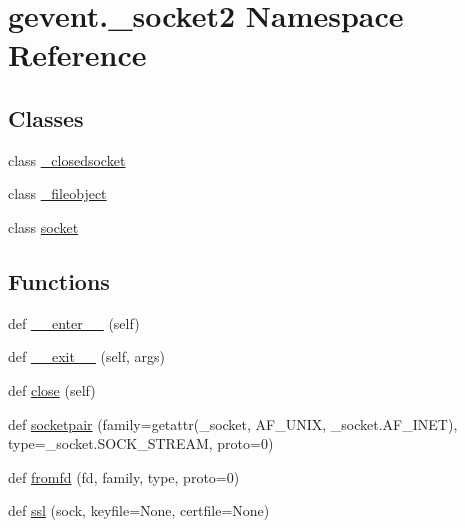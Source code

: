 \hypertarget{namespacegevent_1_1__socket2}{}\section{gevent.\+\_\+socket2 Namespace Reference}
\label{namespacegevent_1_1__socket2}
\subsection*{Classes}
\begin{DoxyCompactItemize}
\item 
class \hyperlink{classgevent_1_1__socket2_1_1__closedsocket}{\+\_\+closedsocket}
\item 
class \hyperlink{classgevent_1_1__socket2_1_1__fileobject}{\+\_\+fileobject}
\item 
class \hyperlink{classgevent_1_1__socket2_1_1socket}{socket}
\end{DoxyCompactItemize}
\subsection*{Functions}
\begin{DoxyCompactItemize}
\item 
def \hyperlink{namespacegevent_1_1__socket2_a151c509c4c19fad9a52d44312bfda6d4}{\+\_\+\+\_\+enter\+\_\+\+\_\+} (self)
\item 
def \hyperlink{namespacegevent_1_1__socket2_a24e78c834272e9de4108c2d7a69033ea}{\+\_\+\+\_\+exit\+\_\+\+\_\+} (self, args)
\item 
def \hyperlink{namespacegevent_1_1__socket2_af1f81f0318af39f13007c97ce6f4cb59}{close} (self)
\item 
def \hyperlink{namespacegevent_1_1__socket2_a4b018b6c679f6878289b2b1a4375b6bb}{socketpair} (family=getattr(\+\_\+socket, \textquotesingle{}A\+F\+\_\+\+U\+N\+IX\textquotesingle{}, \+\_\+socket.\+A\+F\+\_\+\+I\+N\+ET), type=\+\_\+socket.\+S\+O\+C\+K\+\_\+\+S\+T\+R\+E\+AM, proto=0)
\item 
def \hyperlink{namespacegevent_1_1__socket2_aa53a2bfe42bf85f7ce5226e7a3aaf1e5}{fromfd} (fd, family, type, proto=0)
\item 
def \hyperlink{namespacegevent_1_1__socket2_a95b906204400f9b0398e5dc390f0522a}{ssl} (sock, keyfile=None, certfile=None)
\end{DoxyCompactItemize}
